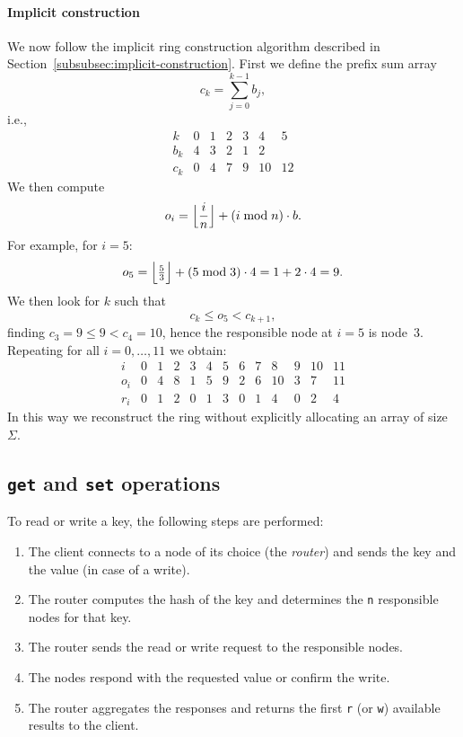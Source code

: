 \paragraph{Implicit construction}
We now follow the implicit ring construction algorithm described in Section~\ref{subsubsec:implicit-construction}.
First we define the prefix sum array
\[
    c_k = \sum_{j=0}^{k-1} b_j,
\]
i.e.,
\[
    \begin{array}{c|cccccc}
        k   & 0 & 1 & 2 & 3 &  4 &  5 \\ \hline
        b_k & 4 & 3 & 2 & 1 &  2 &    \\ \hline
        c_k & 0 & 4 & 7 & 9 & 10 & 12
    \end{array}
\]
We then compute
\[
    o_i = \Bigl\lfloor \frac{i}{n} \Bigr\rfloor + (i \bmod n) \cdot b.
\]
For example, for \(i = 5\):
\[
    o_5 = \Bigl\lfloor \tfrac{5}{3} \Bigr\rfloor + (5 \bmod 3) \cdot 4 = 1 + 2\cdot4 = 9.
\]
We then look for \(k\) such that
\[
    c_k \le o_5 < c_{k+1},
\]
finding \(c_3 = 9 \le 9 < c_4 = 10\), hence the responsible node at \(i=5\) is node~3.
Repeating for all \(i=0,\dots,11\) we obtain:
\[
    \begin{array}{c|cccccccccccc}
        i   & 0 & 1 & 2 & 3 & 4 & 5 & 6 & 7 & 8 & 9 & 10 & 11 \\ \hline
        o_i & 0 & 4 & 8 & 1 & 5 & 9 & 2 & 6 & 10 & 3 & 7 & 11 \\ \hline
        r_i & 0 & 1 & 2 & 0 & 1 & 3 & 0 & 1 & 4 & 0 & 2 & 4
    \end{array}
\]
In this way we reconstruct the ring without explicitly allocating an array of size \(\Sigma\).

\subsection{\texttt{get} and \texttt{set} operations}
\label{subsec:get-set}

To read or write a key, the following steps are performed:
\begin{enumerate}
    \item The client connects to a node of its choice (the \emph{router}) and sends the key and the value (in case of a write).
    \item The router computes the hash of the key and determines the \texttt{n} responsible nodes for that key.
    \item The router sends the read or write request to the responsible nodes.
    \item The nodes respond with the requested value or confirm the write.
    \item The router aggregates the responses and returns the first \texttt{r} (or \texttt{w}) available results to the client.
\end{enumerate}

